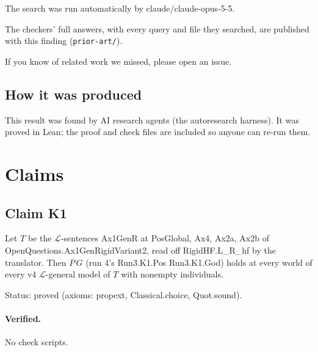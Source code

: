 \documentclass{article}
\begin{document}
The search was run automatically by claude/claude-opus-5-5.

The checkers' full answers, with every query and file they searched, are published with this finding (\texttt{prior-art/}).

If you know of related work we missed, please open an issue.

\subsection*{How it was produced}

This result was found by AI research agents (the autoresearch harness). It was proved in Lean; the proof and check files are included so anyone can re-run them.

\section{Claims}

\subsection*{Claim K1}

Let $T$ be the $\mathcal L$-sentences Ax1GenR at PosGlobal, Ax4, Ax2a, Ax2b of OpenQuestions.Ax1GenRigidVariant2, read off RigidHF.L\_R\_hf by the translator. Then $P\,G$ (run 4's Run3.K1.Pos Run3.K1.God) holds at every world of every v4 $\mathcal L$-general model of $T$ with nonempty individuals.

Status: proved (axioms: propext, Classical.choice, Quot.sound).

\paragraph{Verified.}
No check scripts.
\end{document}
